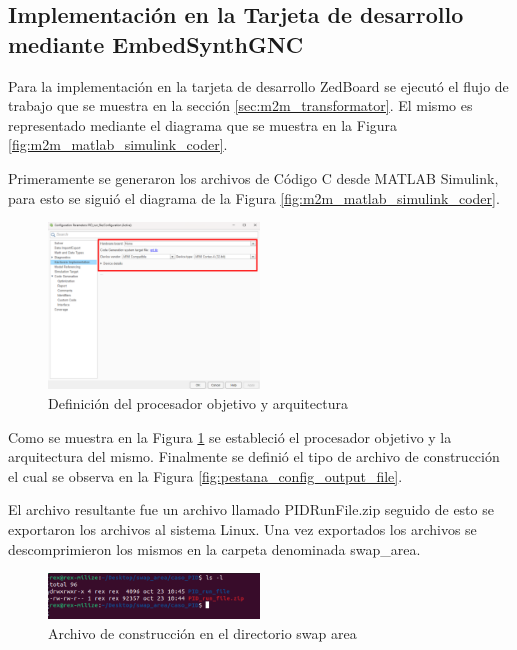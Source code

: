 \subsection{Implementación en la Tarjeta de desarrollo mediante EmbedSynthGNC}

Para la implementación en la tarjeta de desarrollo ZedBoard se ejecutó el flujo de trabajo que se muestra en la sección \ref{sec:m2m_transformator}. El mismo es representado mediante el diagrama que se muestra en la Figura \ref{fig:m2m_matlab_simulink_coder}.

Primeramente se generaron los archivos de Código C desde MATLAB Simulink, para esto se siguió el diagrama de la Figura \ref{fig:m2m_matlab_simulink_coder}. 

\begin{figure}[h!]
    \centering
    \includegraphics[width=0.5\textwidth]{fig/aditional/procesador_pid.pdf}
    \caption{Definición del procesador objetivo y arquitectura}
    \label{fig:system_target_PID}
\end{figure}

Como se muestra en la Figura \ref{fig:system_target_PID} se estableció el procesador objetivo y la arquitectura del mismo. Finalmente se definió el tipo de archivo de construcción el cual se observa en la Figura \ref{fig:pestana_config_output_file}. 

El archivo resultante fue un archivo llamado PIDRunFile.zip seguido de esto se exportaron los archivos al sistema Linux. Una vez exportados los archivos se descomprimieron los mismos en la carpeta denominada swap\_area.

\begin{figure}[h!]
    \centering
    \includegraphics[width=0.5\textwidth]{fig/Capitulo5/Caso_de_estudio_PID/retornos_consola/Screenshot from 2024-10-31 20-21-37.png}
    \caption{Archivo de construcción en el directorio swap area}
    \label{fig:swap_area_PID}
\end{figure}



